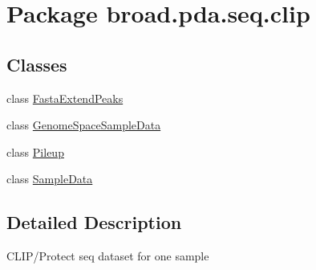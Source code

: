 \hypertarget{namespacebroad_1_1pda_1_1seq_1_1clip}{\section{Package broad.\+pda.\+seq.\+clip}
\label{namespacebroad_1_1pda_1_1seq_1_1clip}
}
\subsection*{Classes}
\begin{DoxyCompactItemize}
\item 
class \hyperlink{classbroad_1_1pda_1_1seq_1_1clip_1_1_fasta_extend_peaks}{Fasta\+Extend\+Peaks}
\item 
class \hyperlink{classbroad_1_1pda_1_1seq_1_1clip_1_1_genome_space_sample_data}{Genome\+Space\+Sample\+Data}
\item 
class \hyperlink{classbroad_1_1pda_1_1seq_1_1clip_1_1_pileup}{Pileup}
\item 
class \hyperlink{classbroad_1_1pda_1_1seq_1_1clip_1_1_sample_data}{Sample\+Data}
\end{DoxyCompactItemize}


\subsection{Detailed Description}
C\+L\+I\+P/\+Protect seq dataset for one sample 
